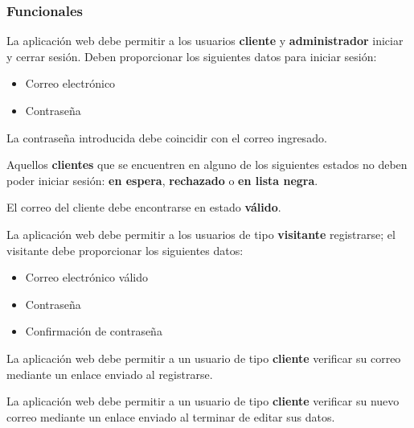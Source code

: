 %
%

\subsubsection{Funcionales}
\vspace{-4.0em}

{
  La aplicación web debe permitir a los usuarios \textbf{cliente} y
  \textbf{administrador} iniciar y cerrar sesión. Deben proporcionar los
  siguientes datos para iniciar sesión:
  \begin{itemize}
    \item Correo electrónico
    \item Contraseña
  \end{itemize}
}

{
  La contraseña introducida debe coincidir con el correo ingresado.
}

{
  Aquellos \textbf{clientes} que se encuentren en alguno de los siguientes
  estados no deben poder iniciar sesión: \textbf{en espera},
  \textbf{rechazado} o \textbf{en lista negra}.
}

{
  El correo del cliente debe encontrarse en estado \textbf{válido}.
}

{
  La aplicación web debe permitir a los usuarios  de tipo \textbf{visitante}
  registrarse; el visitante debe proporcionar los siguientes datos:
  \begin{itemize}
    \item Correo electrónico válido
    \item Contraseña
    \item Confirmación de contraseña
  \end{itemize}
}

{
  La aplicación web debe permitir a un usuario de tipo \textbf{cliente}
  verificar su correo mediante un enlace enviado al registrarse.
}

{
  La aplicación web debe permitir a un usuario de tipo \textbf{cliente}
  verificar su nuevo correo mediante un enlace enviado al terminar de editar
  sus datos.
}

